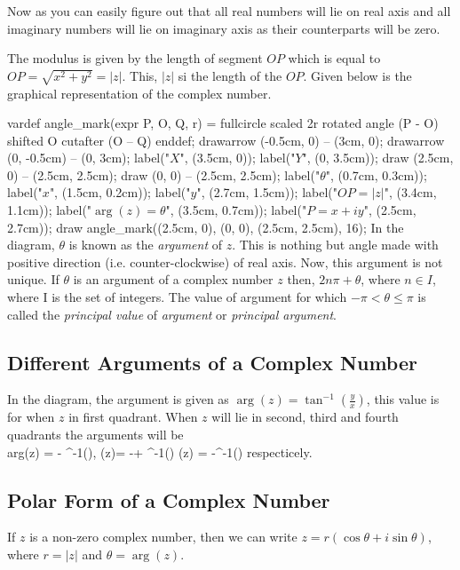 Now as you can easily figure out that all real numbers will lie on real axis and all imaginary numbers will lie on imaginary axis
as their counterparts will be zero.

The modulus is given by the length of segment $OP$ which is equal to $OP=\sqrt{x^2+y^2}=|z|$. This, $|z|$ si the length of the
$OP$. Given below is the graphical representation of the complex number.

\startplacefigure[title=Complex number in argand plane or complex plane.]
  \startMPcalculation
        vardef angle_mark(expr P, O, Q, r) =
      fullcircle scaled 2r rotated angle (P - O)
      shifted O cutafter (O -- Q)
    enddef;
\stopMPcalculation
  \startMPcode
    drawarrow (-0.5cm, 0) -- (3cm, 0);
    drawarrow (0, -0.5cm) -- (0, 3cm);
    label("$X$", (3.5cm, 0));
    label("$Y$", (0, 3.5cm));
    draw (2.5cm, 0) -- (2.5cm, 2.5cm);
    draw (0, 0) -- (2.5cm, 2.5cm);
    label("$\theta$", (0.7cm, 0.3cm));
    label("$x$", (1.5cm, 0.2cm));
    label("$y$", (2.7cm, 1.5cm));
    label("$OP=|z|$", (3.4cm, 1.1cm));
    label("$\arg(z)=\theta$", (3.5cm, 0.7cm));
    label("$P = x + iy$", (2.5cm, 2.7cm));
    draw angle_mark((2.5cm, 0), (0, 0), (2.5cm, 2.5cm), 16);
  \stopMPcode
\stopplacefigure
In the diagram, $\theta$ is known as the {\it argument} of $z$. This is nothing but angle made with positive direction
(i.e. counter-clockwise) of real axis. Now, this argument is not unique. If $\theta$ is an argument of a complex number $z$ then,
$2n\pi + \theta$, where $n\in I$, where I is the set of integers. The value of argument for which $-\pi<\theta\leq \pi$ is called
the {\it principal value} of {\it argument} or {\it principal argument}.

\subsection{Different Arguments of a Complex Number}
In the diagram, the argument is given as $\arg(z) = \tan^{-1}\left(\frac{y}{x}\right)$, this value is for when $z$ in first
quadrant. When $z$ will lie in second, third and fourth quadrants the arguments will be
\startformula \\arg(z) = \pi - \tan^{-1}\left(\right), \arg(z)= -\pi + \tan^{-1}\left(\right)\;\; \arg(z) =
-\tan^{-1}\left(\right)\stopformula
respecticely.

\subsection{Polar Form of a Complex Number}
If $z$ is a non-zero complex number, then we can write $z = r(\cos\theta + i\sin\theta)$, where $r = |z|$ and $\theta = \arg(z)$.

